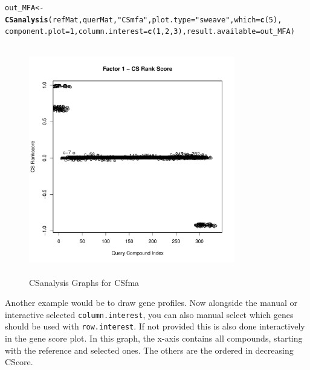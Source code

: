 \documentclass[a4paper]{article}\usepackage[]{graphicx}\usepackage[]{color}
\makeatletter
\newcommand{\hlnum}[1]{\textcolor[rgb]{0.686,0.059,0.569}{#1}}%
\newcommand{\hlstr}[1]{\textcolor[rgb]{0.192,0.494,0.8}{#1}}%
\newcommand{\hlstd}[1]{\textcolor[rgb]{0.345,0.345,0.345}{#1}}%
\newcommand{\hlkwb}[1]{\textcolor[rgb]{0.69,0.353,0.396}{#1}}%
\newcommand{\hlkwc}[1]{\textcolor[rgb]{0.333,0.667,0.333}{#1}}%
\newcommand{\hlkwd}[1]{\textcolor[rgb]{0.737,0.353,0.396}{\textbf{#1}}}%
\newenvironment{kframe}{%
 \def\at@end@of@kframe{}%
 \ifinner\ifhmode%
  \def\at@end@of@kframe{\end{minipage}}%
  \begin{minipage}{\columnwidth}%
 \fi\fi%
 \def\FrameCommand##1{\hskip\@totalleftmargin \hskip-\fboxsep
 \colorbox{shadecolor}{##1}\hskip-\fboxsep
     \hskip-\linewidth \hskip-\@totalleftmargin \hskip\columnwidth}%
 \MakeFramed {\advance\hsize-\width
   \@totalleftmargin\z@ \linewidth\hsize
   \@setminipage}}%
 {\par\unskip\endMakeFramed%
 \at@end@of@kframe}
\newenvironment{knitrout}{}{} %
\makeatother
\begin{document}
\begin{knitrout}
\color{fgcolor}\begin{kframe}
\begin{alltt}
        \hlstd{out_MFA} \hlkwb{<-} \hlkwd{CSanalysis}\hlstd{(refMat,querMat,}\hlstr{"CSmfa"}\hlstd{,}\hlkwc{plot.type}\hlstd{=}\hlstr{"sweave"}\hlstd{,}\hlkwc{which}\hlstd{=}\hlkwd{c}\hlstd{(}\hlnum{5}\hlstd{),}
                        \hlkwc{component.plot}\hlstd{=}\hlnum{1}\hlstd{,}\hlkwc{column.interest}\hlstd{=}\hlkwd{c}\hlstd{(}\hlnum{1}\hlstd{,}\hlnum{2}\hlstd{,}\hlnum{3}\hlstd{),}\hlkwc{result.available}\hlstd{=out_MFA)}
\end{alltt}
\end{kframe}\begin{figure}[H]

\includegraphics[width=9cm,height=10cm]{figure/MFA2-1} \hfill{}

\caption[CSanalysis Graphs for CSfma]{CSanalysis Graphs for CSfma}\label{fig:MFA2}
\end{figure}


\end{knitrout}
\noindent Another example would be to draw gene profiles. Now alongside the
manual or interactive selected \texttt{column.interest}, you can also manual
select which genes should be used with \texttt{row.interest}. If not provided
this is also done interactively in the gene score plot. In this graph, the
x-axis contains all compounds, starting with the reference and selected ones.
The others are the ordered in decreasing CScore.
\end{document}
